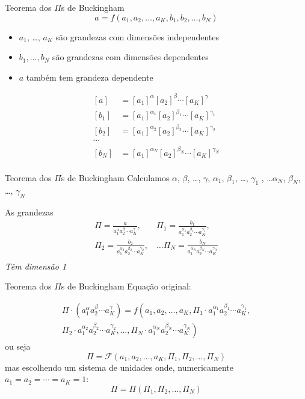 \documentclass{beamer}
\begin{document}
\begin{frame}{Teorema dos $\Pi$s de Buckingham}
  \[
  a = f\left(a_1, a_2, \ldots, a_K, b_1, b_2, \ldots, b_N\right)
  \]
  
\begin{itemize}
\item $a_1$, \ldots, $a_K$ são grandezas com dimensões independentes
\item $b_1, \ldots, b_N$ são grandezas com dimensões dependentes
\item $a$ também tem grandeza dependente
\end{itemize}

\[
\begin{aligned}
  \left[a\right]  &= [a_1]^{\alpha}[a_2]^{\beta} \cdots [a_K]^{\gamma}\\
  \left[b_1\right] &= [a_1]^{\alpha_1}[a_2]^{\beta_1} \cdots [a_K]^{\gamma_1}\\
  \left[b_2\right] &= [a_1]^{\alpha_2}[a_2]^{\beta_2} \cdots [a_K]^{\gamma_2}\\
  \cdots &\\
  \left[b_N\right] &= [a_1]^{\alpha_N}[a_2]^{\beta_N} \cdots [a_K]^{\gamma_N}\\
\end{aligned}
\]


\end{frame}

\begin{frame}{Teorema dos $\Pi$s de Buckingham}
  Calculamos $\alpha$, $\beta$, \ldots, $\gamma$, $\alpha_1$, $\beta_1$, \ldots, $\gamma_1$ , \ldots $\alpha_N$, $\beta_N$, \ldots, $\gamma_N$
  
  As grandezas
  \[
\begin{aligned}
\Pi = \frac{a}{a_1^\alpha a_2^\beta\cdots a_K^\gamma}, \quad
&\Pi_1 = \frac{b_1}{a_1^{\alpha_1} a_2^{\beta_1}\cdots a_K^{\gamma_1}},\\
\Pi_2 = \frac{b_2}{a_1^{\alpha_2} a_2^{\beta_2}\cdots a_K^{\gamma_2}},&\ldots
\Pi_N = \frac{b_N}{a_1^{\alpha_N} a_2^{\beta_N}\cdots a_K^{\gamma_N}}\\
\end{aligned}
\]
\emph{Têm dimensão 1}

\end{frame}


\begin{frame}{Teorema dos $\Pi$s de Buckingham}
  Equação original:



\begin{multline*}
\Pi \cdot \left(a_1^\alpha a_2^\beta\cdots a_K^\gamma\right) =
f\left( a_1, a_2, \ldots, a_K,
\Pi_1 \cdot a_1^{\alpha_1} a_2^{\beta_1}\cdots a_K^{\gamma_1}, \right.\\
\left.\Pi_2 \cdot a_1^{\alpha_2} a_2^{\beta_2}\cdots a_K^{\gamma_2}, 
\ldots, \Pi_N \cdot a_1^{\alpha_N} a_2^{\beta_N}\cdots a_K^{\gamma_N}\right)
\end{multline*}
ou seja
\[
\Pi = \mathcal{F}\left(a_1, a_2, \ldots, a_K, \Pi_1, \Pi_2, \ldots, \Pi_N \right)
\]
mas escolhendo um sistema de unidades onde, numericamente $a_1=a_2=\cdots=a_K=1$:
\[
\Pi = \Pi\left(\Pi_1, \Pi_2, \ldots, \Pi_N \right)
\]


\end{frame}
\end{document}
